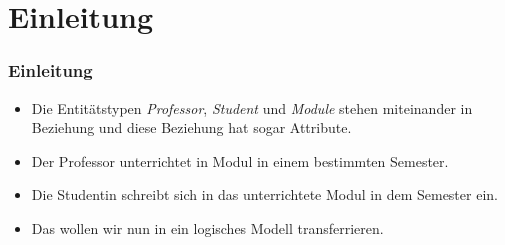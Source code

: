 \documentclass[aspectratio=169,mathserif,notheorems]{beamer}%
\subtitle{40.~Logisches Schema:~Beziehungen höheren Grades}%
\begin{document}
%
%
\startPresentation%
%
\section{Einleitung}%
%
\begin{frame}[t]%
\frametitle{Einleitung}%
\begin{itemize}%
%
%
%
\item<2-> Die Entitätstypen \emph{Professor}, \emph{Student} und \emph{Module} stehen miteinander in Beziehung und diese Beziehung hat sogar Attribute.%
%
\item<3-> Der Professor unterrichtet in Modul in einem bestimmten Semester.%
%
\item<4-> Die Studentin schreibt sich in das unterrichtete Modul in dem Semester ein.%
%
\item<5-> Das wollen wir nun in ein logisches Modell transferrieren.%
\end{itemize}%
%
\end{frame}%
%
\end{document}
